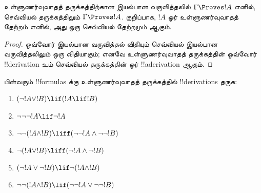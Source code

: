 \documentclass[../../../include/open-logic-section]{subfiles}
\begin{document}
\begin{prop}
  உள்ளுணர்வுவாதத் தருக்கத்திற்கான இயல்பான வருவித்தலில் $\Gamma \Proves !A$
  எனில், செவ்வியல் தருக்கத்திலும் $\Gamma \Proves !A$. குறிப்பாக, $!A$ ஓர்
  உள்ளுணர்வுவாதத் தேற்றம் எனில், அது ஒரு செவ்வியல் தேற்றமும் ஆகும்.
\end{prop}

\begin{proof}
  ஒவ்வோர் இயல்பான வருவித்தல் விதியும் செவ்வியல் இயல்பான வருவித்தலிலும் ஒரு
  விதியாகும்; எனவே உள்ளுணர்வுவாதத் தருக்கத்தின் ஒவ்வோர் !!{derivation} உம்
  செவ்வியல் தருக்கத்தின் ஓர் !!a{derivation} ஆகும்.
\end{proof}

\begin{prob}
  பின்வரும் !!{formula}s க்கு உள்ளுணர்வுவாதத் தருக்கத்தில்
  !!{derivation}s தருக:
  \begin{enumerate}
    \item $(\lnot !A \lor !B) \lif (!A \lif !B)$
    \item $\lnot\lnot\lnot !A \lif \lnot !A$
    \item $\lnot\lnot (!A \land !B) \liff (\lnot\lnot !A\land \lnot \lnot !B)$
    \item $\lnot (!A \lor !B) \liff (\lnot !A \land \lnot !B)$
    \item $(\lnot !A \lor \lnot !B) \lif \lnot (!A \land !B)$
    \item $\lnot\lnot ( !A \land !B) \lif  (\lnot\lnot !A \lor
    \lnot\lnot !B)$
  \end{enumerate}
\end{prob}
\end{document}
